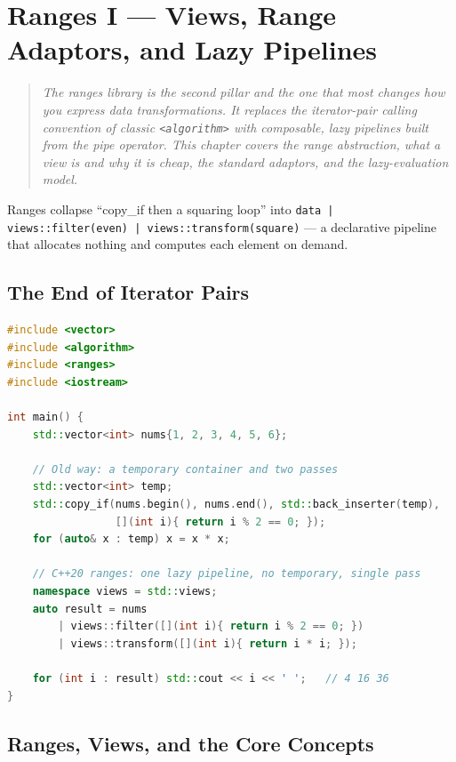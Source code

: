 \chapter{Ranges I --- Views, Range Adaptors, and Lazy Pipelines}
\label{ch:c20-ranges-i}

\begin{quote}
\emph{The ranges library is the second pillar and the one that most changes how you express data transformations. It replaces the iterator-pair calling convention of classic \texttt{<algorithm>} with composable, lazy pipelines built from the pipe operator. This chapter covers the range abstraction, what a view is and why it is cheap, the standard adaptors, and the lazy-evaluation model.}
\end{quote}

Ranges collapse ``copy\_if then a squaring loop'' into \texttt{data | views::filter(even) | views::transform(square)} --- a declarative pipeline that allocates nothing and computes each element on demand.

\section{The End of Iterator Pairs}
\label{sec:c20-end-iter-pairs}

\begin{lstlisting}[language=C++,caption={The old way vs. the ranges way}]
#include <vector>
#include <algorithm>
#include <ranges>
#include <iostream>

int main() {
    std::vector<int> nums{1, 2, 3, 4, 5, 6};

    // Old way: a temporary container and two passes
    std::vector<int> temp;
    std::copy_if(nums.begin(), nums.end(), std::back_inserter(temp),
                 [](int i){ return i % 2 == 0; });
    for (auto& x : temp) x = x * x;

    // C++20 ranges: one lazy pipeline, no temporary, single pass
    namespace views = std::views;
    auto result = nums
        | views::filter([](int i){ return i % 2 == 0; })
        | views::transform([](int i){ return i * i; });

    for (int i : result) std::cout << i << ' ';   // 4 16 36
}
\end{lstlisting}

\section{Ranges, Views, and the Core Concepts}
\label{sec:c20-ranges-views-concepts}

